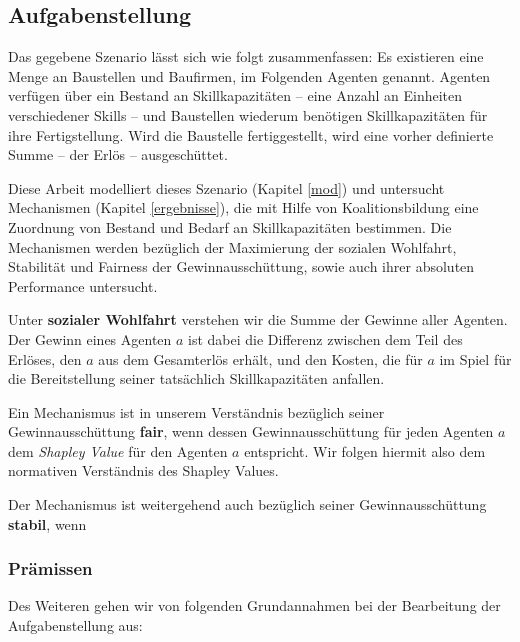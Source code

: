 \subsection{Aufgabenstellung}
\label{task}
Das gegebene Szenario lässt sich wie folgt zusammenfassen: Es existieren eine Menge an Baustellen und Baufirmen, im Folgenden Agenten genannt. Agenten verfügen über ein Bestand an Skillkapazitäten -- eine Anzahl an Einheiten verschiedener Skills -- und Baustellen wiederum benötigen Skillkapazitäten für ihre Fertigstellung. Wird die Baustelle fertiggestellt, wird eine vorher definierte Summe -- der Erlös -- ausgeschüttet.

Diese Arbeit modelliert dieses Szenario (Kapitel \ref{mod}) und untersucht Mechanismen (Kapitel \ref{ergebnisse}), die mit Hilfe von Koalitionsbildung eine Zuordnung von Bestand und Bedarf an Skillkapazitäten bestimmen. Die Mechanismen werden bezüglich der Maximierung der sozialen Wohlfahrt, Stabilität und Fairness der Gewinnausschüttung, sowie auch ihrer absoluten Performance untersucht.

Unter \textbf{sozialer Wohlfahrt} verstehen wir die Summe der  Gewinne aller Agenten. Der Gewinn eines Agenten $a$ ist dabei die Differenz zwischen dem Teil des Erlöses, den $a$ aus dem Gesamterlös erhält, und den Kosten, die für $a$ im Spiel für die Bereitstellung seiner tatsächlich Skillkapazitäten anfallen.

Ein Mechanismus ist in unserem Verständnis bezüglich seiner Gewinnausschüttung \textbf{fair}, wenn dessen Gewinnausschüttung für jeden Agenten $a$ dem \textit{Shapley Value} für den Agenten $a$ entspricht. Wir folgen hiermit also dem normativen Verständnis des Shapley Values.

Der Mechanismus ist weitergehend auch bezüglich seiner Gewinnausschüttung \textbf{stabil}, wenn 

\subsubsection*{Prämissen}
Des Weiteren gehen wir von folgenden Grundannahmen bei der Bearbeitung der Aufgabenstellung aus:

